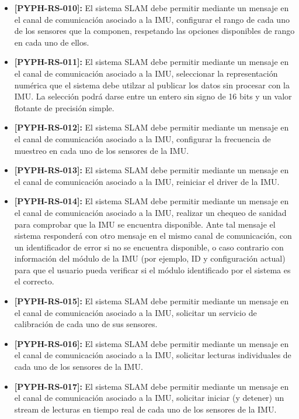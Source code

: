 \documentclass[12pt,a4paper, twosite]{article}
\begin{document}
\begin{itemize}
  \item \textbf{[PYPH-RS-010]:} El sistema SLAM debe permitir mediante un mensaje en el canal de
  comunicación asociado a la IMU, configurar el rango de cada uno de los sensores que la
  componen, respetando las opciones disponibles de rango en cada uno de ellos.
  \item \textbf{[PYPH-RS-011]:} El sistema SLAM debe permitir mediante un mensaje en el canal de
  comunicación asociado a la IMU, seleccionar la representación numérica que el sistema debe
  utilzar al publicar los datos sin procesar con la IMU. La selección podrá darse entre un
  entero sin signo de 16 bits y un valor flotante de precisión simple.
  \item \textbf{[PYPH-RS-012]:} El sistema SLAM debe permitir mediante un mensaje en el canal de
  comunicación asociado a la IMU, configurar la frecuencia de muestreo en cada uno de los
  sensores de la IMU.
  \item \textbf{[PYPH-RS-013]:} El sistema SLAM debe permitir mediante un mensaje en el canal de
  comunicación asociado a la IMU, reiniciar el driver de la IMU.
  \item \textbf{[PYPH-RS-014]:} El sistema SLAM debe permitir mediante un mensaje en el canal de
  comunicación asociado a la IMU, realizar un chequeo de sanidad para comprobar que la IMU se
  encuentra disponible. Ante tal mensaje el sistema responderá con otro mensaje en el mismo
  canal de comunicación, con un identificador de error si no se encuentra disponible, o caso
  contrario con información del módulo de la IMU (por ejemplo, ID y configuración actual) para
  que el usuario pueda verificar si el módulo identificado por el sistema es el correcto.
  \item \textbf{[PYPH-RS-015]:} El sistema SLAM debe permitir mediante un mensaje en el canal de
  comunicación asociado a la IMU, solicitar un servicio de calibración de cada uno de sus
  sensores.
  \item \textbf{[PYPH-RS-016]:} El sistema SLAM debe permitir mediante un mensaje en el canal de
  comunicación asociado a la IMU, solicitar lecturas individuales de cada uno de los sensores
  de la IMU.
  \item \textbf{[PYPH-RS-017]:} El sistema SLAM debe permitir mediante un mensaje en el canal de
  comunicación asociado a la IMU, solicitar iniciar (y detener) un stream de lecturas en tiempo
  real de cada uno de los sensores de la IMU.
\end{itemize}
\end{document}
